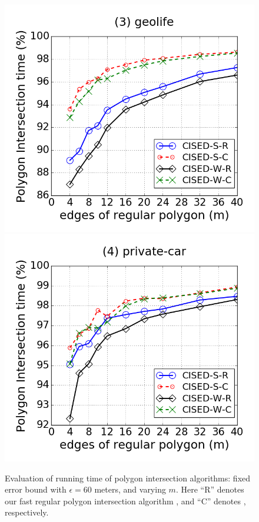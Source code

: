 \begin{figure}[tb!]
\includegraphics[scale = 0.240]{Figures/Exp-M-poly-time-ratio-geolife.png}
\includegraphics[scale = 0.240]{Figures/Exp-M-poly-time-ratio-private.png}
\vspace{-1ex}
\caption{\small Evaluation of running time of polygon intersection algorithms: fixed error bound with $\epsilon=60$ meters, and varying $m$. Here ``R'' denotes our fast regular polygon intersection algorithm \rpia, and ``C'' denotes \cpia, respectively.}
\label{fig:m-poly-time}
\vspace{-1ex}
\end{figure}


